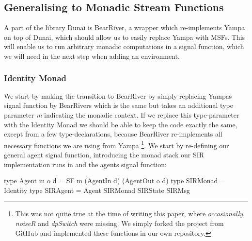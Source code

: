 \subsection{Generalising to Monadic Stream Functions}
A part of the library Dunai is BearRiver, a wrapper which re-implements Yampa on top of Dunai, which should allow us to easily replace Yampa with MSFs. This will enable us to run arbitrary monadic computations in a signal function, which we will need in the next step when adding an environment.

\subsubsection{Identity Monad}
We start by making the transition to BearRiver by simply replacing Yampas signal function by BearRivers which is the same but takes an additional type parameter \textit{m} indicating the monadic context. If we replace this type-parameter with the Identity Monad we should be able to keep the code exactly the same, except from a few type-declarations, because BearRiver re-implements all necessary functions we are using from Yampa \footnote{This was not quite true at the time of writing this paper, where \textit{occasionally}, \textit{noiseR} and \textit{dpSwitch} were missing. We simply forked the project from GitHub and implemented these functions in our own repository.}.
We start by re-defining our general agent signal function, introducing the monad stack our SIR implementation runs in and the agents signal function:

\begin{HaskellCode}
type Agent m o d = SF m (AgentIn d) (AgentOut o d)
type SIRMonad    = Identity
type SIRAgent    = Agent SIRMonad SIRState SIRMsg
\end{HaskellCode}

\begin{comment}
Here is the complete code of \textit{runSimulation}:

\begin{HaskellCode}
TODO: can we be more consise in this code listing?
runSimulation :: RandomGen g 
  => g -> Time -> DTime -> [(AgentId, SIRState)] -> [[SIRState]]
runSimulation g t dt as = map (map aoObservable) aoss
  where
    steps        = floor (t / dt)
    dts          = replicate steps ()
    n            = length as
    (rngs, _)    = rngSplits g n []   -- rngs for each agent
    ais          = map fst as
    sfs          = map (\ (g', (_, s)) -> sirAgent g' ais s) (zip rngs as) -- SF for each agent
    ains         = map (\ (aid, _) -> agentIn aid) as                      -- initial AgentIns
    aossReader   = embed (stepSimulation sfs ains) dts                     -- running simulation
    aossIdentity = runReaderT aossReader dt                                -- running ReaderT
    aoss         = runIdentity aossIdentity                                -- running Identity
\end{HaskellCode}

Note that embed does not take a list of $\Delta t$ any more but simply a list of inputs for each step to the top level signal function.
\end{comment}


